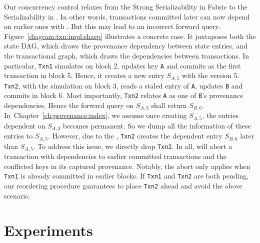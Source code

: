 Our concurrency control relaxes from the Strong Serializability in Fabric to the Serializability in {\fs}.
In other words, transactions committed later can now depend on earlier ones with . 
But this may lead to an incorrect forward query. 
Figure~\ref{diagram:txn:impl:sharp} illustrates a concrete case.
It juxtaposes both the state DAG, which draws the provenance dependency between state entries, and the transactional graph, which draws the dependencies between transactions. 
In particular, \texttt{Txn1} simulates on block 2, updates key \texttt{A} and commits as the first transaction in block 5. Hence, it creates a new entry $S_{A,5}$ with the version 5.
\texttt{Txn2}, with the simulation on block 3, reads a staled entry of \texttt{A}, updates \texttt{B} and commits in block 6. 
Most importantly, \texttt{Txn2} relates \texttt{A} as one of \texttt{B}'s provenance dependencies. 
Hence the forward query on $S_{A,3}$ shall return $S_{B,6}$. 
In~Chapter~\ref{ch:provenance:index}, we assume once creating $S_{A,5}$, the entries dependent on $S_{A,3}$ becomes permanent. So we dump all the information of these entries to $S_{A,5}$. 
However, due to the , \texttt{Txn2} creates the dependent entry $S_{B,6}$ later than $S_{A,5}$.
To address this issue, we directly drop \texttt{Txn2}. 
In all, {\fs} will abort a transaction with  dependencies to earlier committed transactions and the conflicted keys in its captured provenance. 
Notably, the abort only applies when \texttt{Txn1} is already committed in earlier blocks. 
If \texttt{Txn1} and \texttt{Txn2} are both pending, our reordering procedure guarantees to place \texttt{Txn2} ahead and avoid the above scenario. 

\section{Experiments}
\label{ch:txn:exp}

